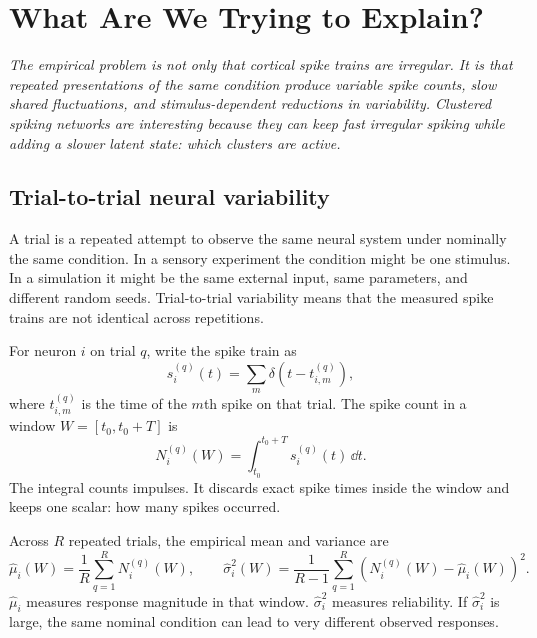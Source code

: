 \chapter{What Are We Trying to Explain?}
\label{ch:scientific-problem}

\textit{The empirical problem is not only that cortical spike trains are irregular. It is that repeated presentations of the same condition produce variable spike counts, slow shared fluctuations, and stimulus-dependent reductions in variability. Clustered spiking networks are interesting because they can keep fast irregular spiking while adding a slower latent state: which clusters are active.}

\section{Trial-to-trial neural variability}
\label{sec:trial-to-trial-neural-variability}

A trial is a repeated attempt to observe the same neural system under nominally the same condition. In a sensory experiment the condition might be one stimulus. In a simulation it might be the same external input, same parameters, and different random seeds. Trial-to-trial variability means that the measured spike trains are not identical across repetitions.

For neuron $i$ on trial $q$, write the spike train as
%
\begin{equation}
  s_i^{(q)}(t)=\sum_m \delta(t-t_{i,m}^{(q)}),
  \label{eq:trial-spike-train}
\end{equation}
%
where $t_{i,m}^{(q)}$ is the time of the $m$th spike on that trial. The spike count in a window $W=[t_0,t_0+T]$ is
%
\begin{equation}
  N_i^{(q)}(W)
  =
  \int_{t_0}^{t_0+T} s_i^{(q)}(t)\,\dd t .
  \label{eq:trial-spike-count}
\end{equation}
%
The integral counts impulses. It discards exact spike times inside the window and keeps one scalar: how many spikes occurred.

Across $R$ repeated trials, the empirical mean and variance are
%
\begin{equation}
  \widehat\mu_i(W)
  =
  \frac{1}{R}\sum_{q=1}^R N_i^{(q)}(W),
  \qquad
  \widehat\sigma_i^2(W)
  =
  \frac{1}{R-1}\sum_{q=1}^R
  \left(N_i^{(q)}(W)-\widehat\mu_i(W)\right)^2.
  \label{eq:trial-count-mean-variance}
\end{equation}
%
$\widehat\mu_i$ measures response magnitude in that window. $\widehat\sigma_i^2$ measures reliability. If $\widehat\sigma_i^2$ is large, the same nominal condition can lead to very different observed responses.


